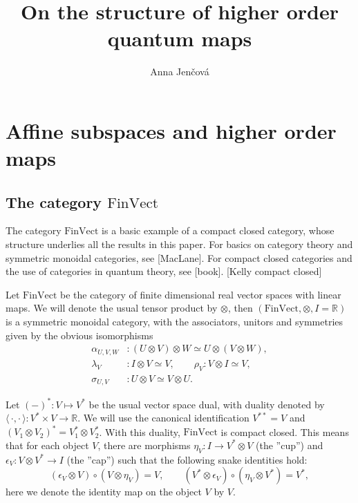 \documentclass[12pt]{article}
\title{On the structure of  higher order quantum maps}
\author{Anna Jen\v cov\'a}
\theoremstyle{definition}
\theoremstyle{remark}
\def\<{\langle\,}
\def\>{\,\rangle}
\def \FV{\mathrm{FinVect}}
\begin{document}
\maketitle

\section{Affine subspaces and higher order maps}

\subsection{The category $\FV$} \label{sec:fv}


The category $\FV$ is a basic  example of a compact closed category, whose structure
underlies all the results in this paper. For basics on category theory and symmetric
monoidal categories, see [MacLane]. For compact closed categories and the use of categories in quantum theory, see
[book]. [Kelly compact closed] 



Let  $\FV$ be the category of finite dimensional real vector spaces with linear maps. 
We will denote the usual tensor product by $\otimes$, then  $(\FV,\otimes, I=\mathbb R)$
is a symmetric monoidal category, with the associators, unitors and symmetries given by
the obvious isomorphisms 
\begin{align*}
\alpha_{U,V,W}&:(U\otimes V)\otimes W\simeq U\otimes (V\otimes W), \\
\lambda_V&: I\otimes
V\simeq
V, \qquad \rho_V: V\otimes I\simeq V,\\
\sigma_{U,V}&: U\otimes V\simeq V\otimes U.
\end{align*}



Let  $(-)^*: V\mapsto V^*$ be the usual vector space dual, with duality denoted by
$\<\cdot,\cdot\>: V^*\times V\to \mathbb R$. We will use the canonical identification
$V^{**}=V$ and $(V_1\otimes V_2)^*=V_1^*\otimes V_2^*$. With this duality, $\FV$ is
compact closed. This means that for each object $V$, there are morphisms $\eta_V: I\to V^*\otimes
V$ (the ''cup'') and $\epsilon_V: V\otimes V^*\to I$ (the ''cap'') such that the following snake
identities hold:
\begin{equation}\label{eq:snake}
(\epsilon_V\otimes V)\circ (V\otimes \eta_V)=V,\qquad (V^*\otimes \epsilon_V)\circ
(\eta_V\otimes V^*)=V^*,
\end{equation}
here we denote the identity map on the object $V$ by $V$. 
\end{document}
